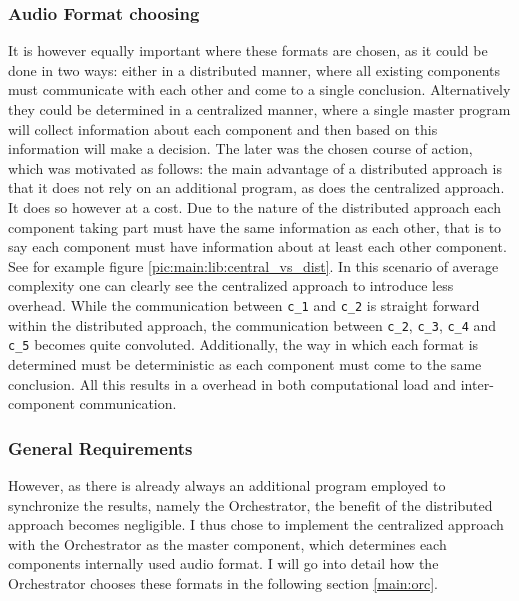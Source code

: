 \subsubsection{Audio Format choosing}
\label{main:lib:format_chooosing}
It is however equally important where these formats are chosen, as it could be done in two ways:
either in a distributed manner, where all existing components must communicate with each other and come to a single conclusion.
Alternatively they could be determined in a centralized manner, where a single master program will collect information about each component and then based on this information will make a decision.
The later was the chosen course of action, which was motivated as follows:
the main advantage of a distributed approach is that it does not rely on an additional program, as does the centralized approach.
It does so however at a cost. 
Due to the nature of the distributed approach each component taking part must have the same information as each other, that is to say each component must have information about at least each other component.
See for example figure \ref{pic:main:lib:central_vs_dist}.
In this scenario of average complexity one can clearly see the centralized approach to introduce less overhead.
While the communication between \texttt{c\_1} and \texttt{c\_2} is straight forward within the distributed approach, the communication between \texttt{c\_2}, \texttt{c\_3}, \texttt{c\_4} and \texttt{c\_5} becomes quite convoluted.
Additionally, the way in which each format is determined must be deterministic as each component must come to the same conclusion.
All this results in a overhead in both computational load and inter-component communication.

\subsubsection{General Requirements}
However, as there is already always an additional program  employed to synchronize the results, namely the Orchestrator, the benefit of the distributed approach becomes negligible.
I thus chose to implement the centralized approach with the Orchestrator as the master component, which determines each components internally used audio format.
I will go into detail how the Orchestrator chooses these formats in the following section \ref{main:orc}.

